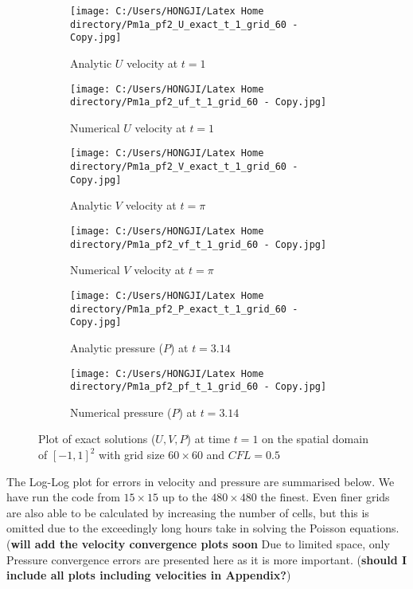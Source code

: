 \begin{figure}[H]
	\centering
	\begin{subfigure}[t]{2.5in}
		\centering
		\texttt{[image: C:/Users/HONGJI/Latex Home directory/Pm1a\_pf2\_U\_exact\_t\_1\_grid\_60 - Copy.jpg]}
		\caption{Analytic $U$ velocity at $t=1$}\label{fig:6.1a}		
	\end{subfigure}
	\quad
	\begin{subfigure}[t]{2.5in}
		\centering
		\texttt{[image: C:/Users/HONGJI/Latex Home directory/Pm1a\_pf2\_uf\_t\_1\_grid\_60 - Copy.jpg]}
		\caption{Numerical $U$ velocity at $t=1$}\label{fig:6.1b}
	\end{subfigure}
	\quad
	\begin{subfigure}[t]{2.5in}
		\centering
		\texttt{[image: C:/Users/HONGJI/Latex Home directory/Pm1a\_pf2\_V\_exact\_t\_1\_grid\_60 - Copy.jpg]}
		\caption{Analytic $V$ velocity at $t=\pi$}\label{fig:6.1c}
	\end{subfigure}
	\quad
	\begin{subfigure}[t]{2.5in}
		\centering
		\texttt{[image: C:/Users/HONGJI/Latex Home directory/Pm1a\_pf2\_vf\_t\_1\_grid\_60 - Copy.jpg]}
		\caption{Numerical $V$ velocity at $t=\pi$}\label{fig:6.1d}
	\end{subfigure}
	\quad	
	\begin{subfigure}[t]{2.5in}
		\centering
		\texttt{[image: C:/Users/HONGJI/Latex Home directory/Pm1a\_pf2\_P\_exact\_t\_1\_grid\_60 - Copy.jpg]}
		\caption{Analytic pressure ($P$) at $t=3.14$}\label{fig:6.1e}
	\end{subfigure}
	\quad	
	\begin{subfigure}[t]{2.5in}
		\centering
		\texttt{[image: C:/Users/HONGJI/Latex Home directory/Pm1a\_pf2\_pf\_t\_1\_grid\_60 - Copy.jpg]}
		\caption{Numerical pressure ($P$) at $t=3.14$}\label{fig:6.1f}
	\end{subfigure}
	\caption{Plot of exact solutions ($U,V,P$) at time $t=1$ on the spatial domain of $[-1,1]^2$ with grid size $60 \times 60$ and $CFL=0.5$}\label{fig:6.1}
\end{figure}

The Log-Log plot for errors in velocity and pressure are summarised below. We have run the code from $15 \times 15$ up to the $480 \times 480$ the finest. Even finer grids are also able to be calculated by increasing the number of cells, but this is omitted due to the exceedingly long hours take in solving the Poisson equations. (\textbf{will add the velocity convergence plots soon} Due to limited space, only Pressure convergence errors are presented here as it is more important. (\textbf{should I include all plots including velocities in Appendix?})\\

